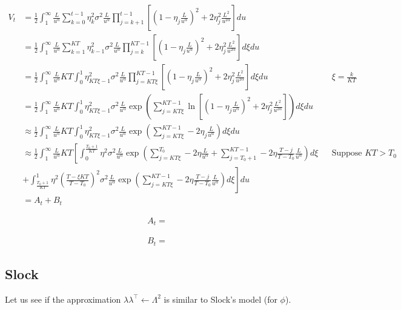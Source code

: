 \documentclass{article}
\begin{document}
\begin{align*}
V_t &= \frac{1}{2} \int_1^\infty \frac{L}{u^\alpha} \sum_{k=0}^{t-1} \eta_k^2 \sigma^2 \frac{L}{u^\alpha} \prod_{j=k+1}^{t-1} \left[ \left(1-\eta_j\frac{L}{u^\alpha}\right)^2+2\eta_j^2 \frac{L^2}{u^{2\alpha}}\right]du
\\&=
\frac{1}{2} \int_1^\infty \frac{L}{u^\alpha} \sum_{k=1}^{KT} \eta_{k-1}^2 \sigma^2 \frac{L}{u^\alpha} \prod_{j=k}^{KT-1} \left[ \left(1-\eta_j\frac{L}{u^\alpha}\right)^2+2\eta_j^2 \frac{L^2}{u^{2\alpha}}\right]d\xi du
\\&=
\frac{1}{2} \int_1^\infty \frac{L}{u^\alpha} KT\int_0^1 \eta_{KT\xi-1}^2 \sigma^2 \frac{L}{u^\alpha} \prod_{j=KT\xi}^{KT-1} \left[ \left(1-\eta_j\frac{L}{u^\alpha}\right)^2+2\eta_j^2 \frac{L^2}{u^{2\alpha}}\right]d\xi du && \xi = \frac{k}{KT}
\\&=
\frac{1}{2} \int_1^\infty \frac{L}{u^\alpha} KT\int_0^1 \eta_{KT\xi-1}^2 \sigma^2 \frac{L}{u^\alpha} \exp\left(\sum_{j=KT\xi}^{KT-1} \ln\left[ \left(1-\eta_j\frac{L}{u^\alpha}\right)^2+2\eta_j^2 \frac{L^2}{u^{2\alpha}}\right]\right)d \xi du 
\\&\approx
\frac{1}{2} \int_1^\infty \frac{L}{u^\alpha} KT\int_0^1 \eta_{KT\xi-1}^2 \sigma^2 \frac{L}{u^\alpha} \exp\left(\sum_{j=KT\xi}^{KT-1} -2\eta_j\frac{L}{u^\alpha }\right)d \xi du 
\\&\approx
\frac{1}{2} \int_1^\infty \frac{L}{u^\alpha} KT\left[ \int_0^\frac{T_0+1}{KT} \eta^2 \sigma^2 \frac{L}{u^\alpha} \exp\left(\sum_{j=KT\xi}^{T_0} -2\eta\frac{L}{u^\alpha } + \sum_{j=T_0+1}^{KT-1} -2\eta\frac{T-j}{T-T_0}\frac{L}{u^\alpha }\right)d \xi \right. && \text{Suppose } KT > T_0
\\&
\left. + \int_\frac{T_0+1}{KT}^1 \eta^2(\frac{T-\xi KT}{T-T_0})^2 \sigma^2 \frac{L}{u^\alpha} \exp\left(\sum_{j=KT\xi}^{KT-1} -2\eta\frac{T-j}{T-T_0}\frac{L}{u^\alpha }\right)d \xi\right] du
\\&= A_t + B_t
\end{align*}

\begin{align*}
A_t = 
\end{align*}

\begin{align*}
B_t = 
\end{align*}

\subsection{Slock}

Let us see if the approximation $\lambda \lambda^\top \leftarrow \Lambda^2$ is similar to Slock's model (for $\phi$).
\end{document}
